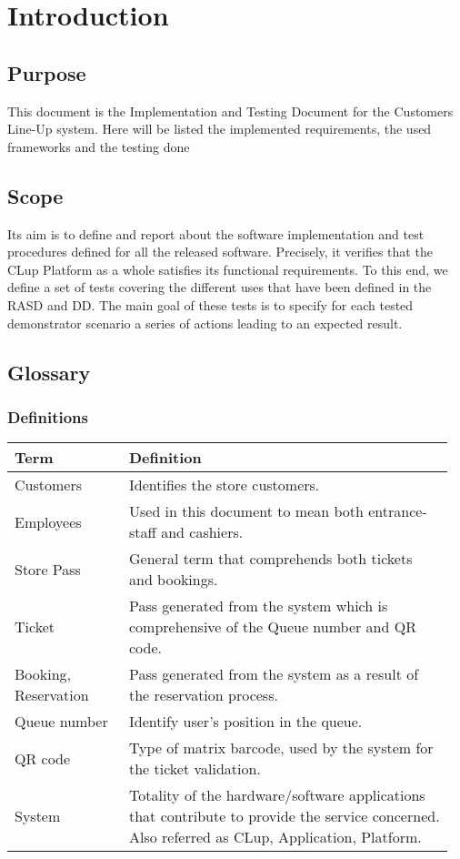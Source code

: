 \chapter{Introduction}

\section{Purpose}
This document is the Implementation and Testing Document for the Customers Line-Up system. Here will be listed the implemented requirements, the used frameworks and the testing done

\section{Scope}
Its aim is to define and report about the software implementation and test procedures defined for all the released software. Precisely, it verifies that the CLup Platform as a whole satisfies its functional requirements. To this end, we define a set of tests covering the different uses that have been defined in the RASD and DD. The main goal of these tests  is  to  specify  for  each  tested  demonstrator scenario a series of actions leading to an expected result.

\section{Glossary}
\subsection{Definitions}
\begin{center}
	\begin{tabular}{@{}p{0.25\linewidth} p{0.71\linewidth}@{}}
		\toprule
		\textbf{Term} & \textbf{Definition}\\
		\midrule
		Customers &  Identifies the store customers.\\
		Employees & Used in this document to mean both entrance-staff and cashiers.\\
		Store Pass & General term that comprehends both tickets and bookings.\\
		Ticket & Pass generated from the system which is comprehensive of the Queue number and QR code.\\
		Booking, Reservation & Pass generated from the system as a result of the reservation process.\\
		Queue number & Identify user's position in the queue.\\
		QR code & Type of matrix barcode, used by the system for the ticket validation.\\
		System & Totality of the hardware/software applications that contribute to provide the service concerned. Also referred as CLup, Application, Platform.\\
		\bottomrule
	\end{tabular}
\end{center}

